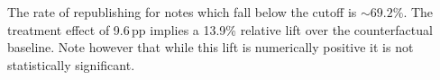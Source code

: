 The rate of republishing for notes which fall below the cutoff is $\sim 69.2\%$. The treatment effect of 9.6\,pp implies a 13.9\% relative lift over the counterfactual baseline. Note however that while this lift is numerically positive it is not statistically significant.
